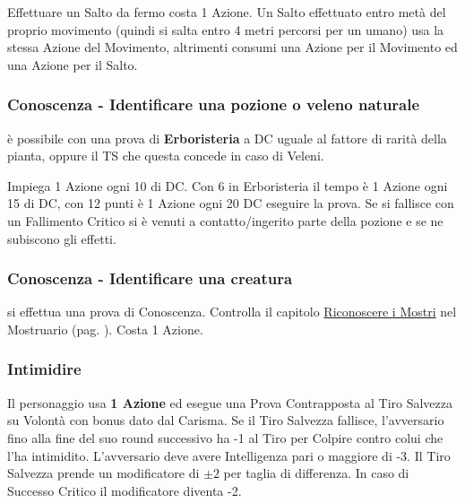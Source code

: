 \begin{multicols}{2}
Effettuare un Salto da fermo costa 1 Azione. Un Salto effettuato entro metà del proprio movimento (quindi si salta entro 4 metri percorsi per un umano) usa la stessa Azione del Movimento, altrimenti consumi una Azione per il Movimento ed una Azione per il Salto.

\titlespacing*{\subsubsection}{0pt}{0.5em}{0.5em}\subsubsection*{Conoscenza - Identificare una pozione o veleno naturale} \label{identificarepozioni}
è possibile con una prova di \textbf{Erboristeria} a DC uguale al fattore di rarità della pianta, oppure il TS che questa concede in caso di Veleni.

Impiega 1 Azione ogni 10 di DC. Con 6 in Erboristeria il tempo è 1 Azione ogni 15 di DC, con 12 punti è 1 Azione ogni 20 DC eseguire la prova. Se si fallisce con un Fallimento Critico si è venuti a contatto/ingerito parte della pozione e se ne subiscono gli effetti.

\titlespacing*{\subsubsection}{0pt}{0.5em}{0.5em}\subsubsection*{Conoscenza - Identificare una creatura} \label{riconosceremostro}\hypertarget{riconosceremostro}{}
si effettua una prova di Conoscenza. Controlla il capitolo \hyperlink{riconoscereimostri}{Riconoscere i Mostri} nel Mostruario (pag. \pageref{riconoscereimostri}). Costa 1 Azione.

\titlespacing*{\subsubsection}{0pt}{0.5em}{0.5em}\subsubsection*{Intimidire}\label{intimidire}
Il personaggio usa \textbf{1 Azione} ed esegue una Prova Contrapposta al Tiro Salvezza su Volontà con bonus dato dal Carisma.
Se il Tiro Salvezza fallisce, l'avversario fino alla fine del suo round successivo ha -1 al Tiro per Colpire contro colui che l'ha intimidito. L'avversario deve avere Intelligenza pari o maggiore di -3. Il Tiro Salvezza prende un modificatore di $\pm2$ per taglia di differenza. In caso di Successo Critico il modificatore diventa -2.


\end{multicols}
